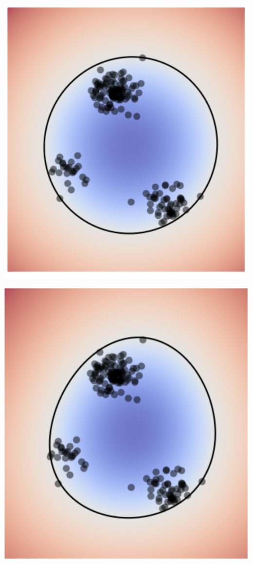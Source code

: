 \documentclass[10pt,aspectratio=169,handout]{beamer}
\begin{document}
\begin{frame}
    \begin{minipage}[t]{0.45\textwidth}
        \includegraphics[width=\textwidth]{images/task-5-5-2-4.png}
    \end{minipage}
    \begin{minipage}[t]{0.45\textwidth}
        \includegraphics[width=\textwidth]{images/task-5-5-2-2.png}
    \end{minipage}
\end{frame}
\end{document}

